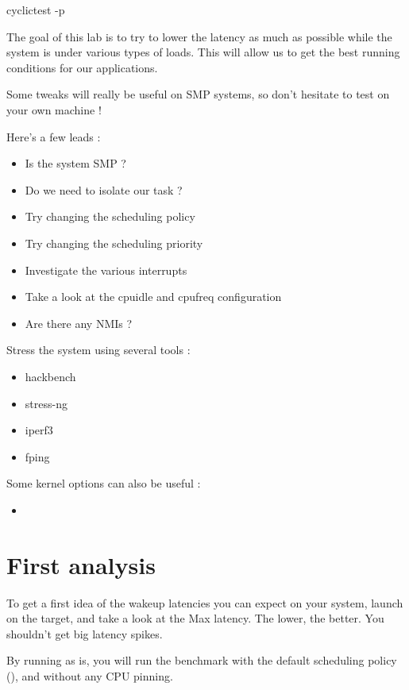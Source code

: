 \begin{bashinput}
cyclictest -p 
\end{bashinput}

The goal of this lab is to try to lower the latency as much as possible while
the system is under various types of loads. This will allow us to get the
best running conditions for our applications.

Some tweaks will really be useful on SMP systems, so don't hesitate to test on
your own machine !

Here's a few leads :

\begin{itemize}
	\item Is the system SMP ?
	\item Do we need to isolate our task ?
	\item Try changing the scheduling policy
	\item Try changing the scheduling priority
	\item Investigate the various interrupts
	\item Take a look at the cpuidle and cpufreq configuration
	\item Are there any NMIs ?
\end{itemize}

Stress the system using several tools :

\begin{itemize}
	\item hackbench
	\item stress-ng
	\item iperf3
	\item fping
\end{itemize}

Some kernel options can also be useful :

\begin{itemize}
	\item {}
\end{itemize}

\section{First analysis}

To get a first idea of the wakeup latencies you can expect on your system, launch
 on the target, and take a look at the Max latency. The lower, the
better. You shouldn't get big latency spikes.

By running  as is, you will run the benchmark with the default
scheduling policy (), and without any CPU pinning.


